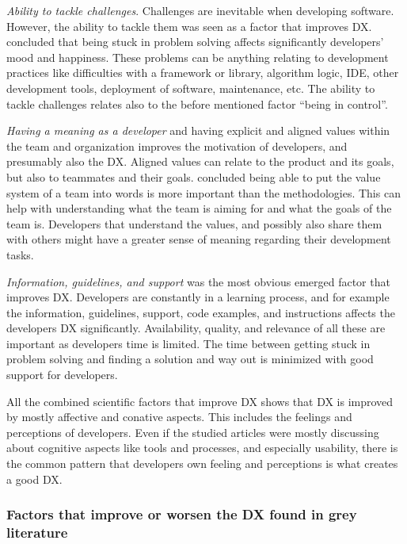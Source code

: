 \documentclass[english, 12pt, a4paper, sci, utf8, a-1b, online]{aaltothesis}
\begin{document}
\textit{Ability to tackle challenges}. Challenges are inevitable when developing software. However, the ability to tackle them was seen as a factor that improves DX. \textcite{what-happens-when-unhappy} concluded that being stuck in problem solving affects significantly developers' mood and happiness. These problems can be anything relating to development practices like difficulties with a framework or library, algorithm logic, IDE, other development tools, deployment of software, maintenance, etc. The ability to tackle challenges relates also to the before mentioned factor ``being in control''.

\textit{Having a meaning as a developer} and having explicit and aligned values within the team and organization improves the motivation of developers, and presumably also the DX. Aligned values can relate to the product and its goals, but also to teammates and their goals. \textcite{fagerholm2014examining} concluded being able to put the value system of a team into words is more important than the methodologies. This can help with understanding what the team is aiming for and what the goals of the team is. Developers that understand the values, and possibly also share them with others might have a greater sense of meaning regarding their development tasks.

\textit{Information, guidelines, and support} was the most obvious emerged factor that improves DX. Developers are constantly in a learning process, and for example the information, guidelines, support, code examples, and instructions affects the developers DX significantly. Availability, quality, and relevance of all these are important as developers time is limited. The time between getting stuck in problem solving and finding a solution and way out is minimized with good support for developers.

All the combined scientific factors that improve DX shows that DX is improved by mostly affective and conative aspects. This includes the feelings and perceptions of developers. Even if the studied articles were mostly discussing about cognitive aspects like tools and processes, and especially usability, there is the common pattern that developers own feeling and perceptions is what creates a good DX.

\subsubsection{Factors that improve or worsen the DX found in grey literature}
\end{document}
